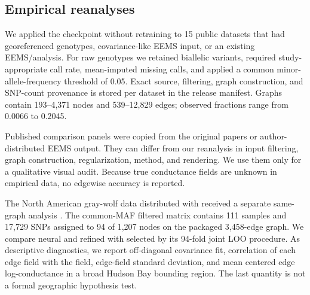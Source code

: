 \subsection{Empirical reanalyses}

We applied the checkpoint without retraining to 15 public datasets that had
georeferenced genotypes, covariance-like EEMS input, or an existing
EEMS/\feems analysis. For raw genotypes we retained biallelic variants,
required study-appropriate call rate, mean-imputed missing calls, and applied a
common minor-allele-frequency threshold of 0.05. Exact source, filtering,
graph construction, and SNP-count provenance is stored per dataset in the
release manifest. Graphs contain 193--4,371 nodes and 539--12,829 edges;
observed fractions range from 0.0066 to 0.2045.

Published comparison panels were copied from the original papers or
author-distributed EEMS output. They can differ from our reanalysis in input
filtering, graph construction, regularization, method, and rendering. We use
them only for a qualitative visual audit. Because true conductance fields are
unknown in empirical data, no edgewise accuracy is reported.

The North American gray-wolf data distributed with \feems received a separate
same-graph analysis \citep{schweizer2016wolves,marcus2021feems}. The common-MAF
filtered matrix contains 111 samples and 17,729 SNPs assigned to 94 of 1,207
nodes on the packaged 3,458-edge graph. We compare neural and refined \dreems
with \feems selected by its 94-fold joint LOO procedure. As descriptive
diagnostics, we report off-diagonal covariance fit, correlation of each
\dreems edge field with the \feems field, edge-field standard deviation, and
mean centered edge log-conductance in a broad Hudson Bay bounding region. The
last quantity is not a formal geographic hypothesis test.
